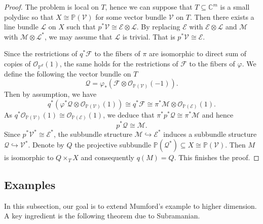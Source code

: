 \documentclass[english,reqno]{amsart}
\newcommand\bbC{{\mathbb C}}
\newcommand\bbP{{\mathbb P}}
\newcommand\sE{{\mathscr E}}
\newcommand\sF{{\mathscr F}}
\newcommand\sL{{\mathscr L}}
\newcommand\sM{{\mathscr M}}
\newcommand\sO{{\mathscr O}}
\newcommand\sQ{{\mathscr Q}}
\newcommand\sV{{\mathscr V}}
\theoremstyle{plain}
\theoremstyle{definition}
\numberwithin{equation}{section} %
\begin{document}
\begin{proof}
	The problem is local on $T$, hence we can suppose that $T\subseteq \bbC^m$ is a small polydisc  so that   $X\cong \bbP(\sV)$ for some vector bundle $\sV$ on  $T$. 
	Then there exists a line bundle $\sL$ on  $X$ such that $p^*\sV\cong \sE\otimes \sL$. 
	By  replacing $\sE$ with $\sE\otimes \sL$ and   $\sM$ with $\sM\otimes \sL^*$, we may assume that $\sL$ is trivial. That is $p^*\sV\cong \sE$.
	
	Since the restrictions of $q^*\sF$ to the fibers of $\pi$ are isomorphic to direct sum of copies of $\sO_{\bbP^d}(1)$, the same holds for the restrictions of $\sF$ to the fibers of $\varphi$. 
	We define the following  the vector bundle on $T$
	\[
	\sQ=\varphi_*(\sF\otimes \sO_{\bbP(\sV)}(-1)).
	\]
	Then by assumption, we have
	\[
	q^*(\varphi^*\sQ\otimes \sO_{\bbP(\sV)}(1))\cong q^*\sF\cong \pi^*\sM\otimes \sO_{\bbP(\sE)}(1).
	\] 
	As $q^*\sO_{\bbP(\sV)}(1)\cong \sO_{\bbP(\sE)}(1)$, we deduce that $\pi^*p^*\sQ\cong \pi^*\sM$ and hence
	\[
	 p^*\sQ\cong \sM.
	\]
	 Since $p^*\sV^*\cong \sE^*$, the subbundle structure  $\sM \hookrightarrow \sE^*$ induces a subbundle structure $\sQ \hookrightarrow \sV^*$. Denote by $Q$ the projective  subbundle $\bbP(\sQ^*) \subseteq X \cong \bbP(\sV )$. 
	 Then $M$ is isomorphic to $Q\times_T X$ and consequently $q(M)=Q$. This finishes the proof.
\end{proof}





















\subsection{Examples}

\label{Subsection:examples}


In this subsection, our goal is to extend Mumford's example to higher dimension.
A key ingredient is the following theorem due to Subramanian.
\end{document}

